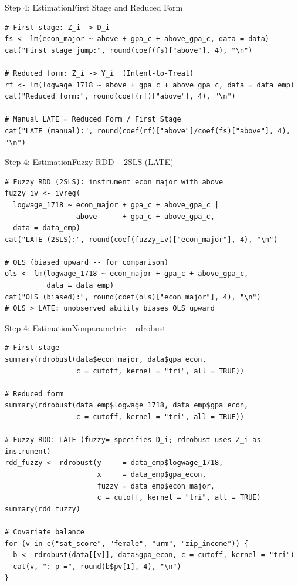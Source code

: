 \documentclass[hyperref={pdfpagelabels=false}]{beamer}
\begin{document}
\begin{frame}[fragile]{Step 4: Estimation}{First Stage and Reduced Form}
\begin{lstlisting}[style=r-style]
# First stage: Z_i -> D_i
fs <- lm(econ_major ~ above + gpa_c + above_gpa_c, data = data)
cat("First stage jump:", round(coef(fs)["above"], 4), "\n")

# Reduced form: Z_i -> Y_i  (Intent-to-Treat)
rf <- lm(logwage_1718 ~ above + gpa_c + above_gpa_c, data = data_emp)
cat("Reduced form:", round(coef(rf)["above"], 4), "\n")

# Manual LATE = Reduced Form / First Stage
cat("LATE (manual):", round(coef(rf)["above"]/coef(fs)["above"], 4), "\n")
\end{lstlisting}
\end{frame}


\begin{frame}[fragile]{Step 4: Estimation}{Fuzzy RDD -- 2SLS (LATE)}
\begin{lstlisting}[style=r-style]
# Fuzzy RDD (2SLS): instrument econ_major with above
fuzzy_iv <- ivreg(
  logwage_1718 ~ econ_major + gpa_c + above_gpa_c |
                 above      + gpa_c + above_gpa_c,
  data = data_emp)
cat("LATE (2SLS):", round(coef(fuzzy_iv)["econ_major"], 4), "\n")

# OLS (biased upward -- for comparison)
ols <- lm(logwage_1718 ~ econ_major + gpa_c + above_gpa_c,
          data = data_emp)
cat("OLS (biased):", round(coef(ols)["econ_major"], 4), "\n")
# OLS > LATE: unobserved ability biases OLS upward
\end{lstlisting}
\end{frame}


\begin{frame}[fragile]{Step 4: Estimation}{Nonparametric -- rdrobust}
\begin{lstlisting}[style=r-style]
# First stage
summary(rdrobust(data$econ_major, data$gpa_econ,
                 c = cutoff, kernel = "tri", all = TRUE))

# Reduced form
summary(rdrobust(data_emp$logwage_1718, data_emp$gpa_econ,
                 c = cutoff, kernel = "tri", all = TRUE))

# Fuzzy RDD: LATE (fuzzy= specifies D_i; rdrobust uses Z_i as instrument)
rdd_fuzzy <- rdrobust(y     = data_emp$logwage_1718,
                      x     = data_emp$gpa_econ,
                      fuzzy = data_emp$econ_major,
                      c = cutoff, kernel = "tri", all = TRUE)
summary(rdd_fuzzy)

# Covariate balance
for (v in c("sat_score", "female", "urm", "zip_income")) {
  b <- rdrobust(data[[v]], data$gpa_econ, c = cutoff, kernel = "tri")
  cat(v, ": p =", round(b$pv[1], 4), "\n")
}
\end{lstlisting}
\end{frame}
\end{document}
